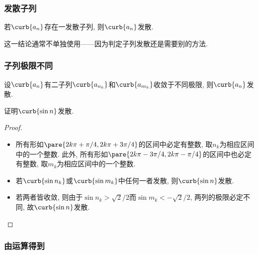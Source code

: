 \documentclass{ctexart}
\begin{document}

\subsubsection{发散子列} %
\label{ssub:发散子列}

\begin{theorem}[子列发散蕴含发散]
    \label{thm:子列发散蕴含发散}
    若$\curb{a_n}$存在一发散子列, 则$\curb{a_n}$发散.
\end{theorem}
这一结论通常不单独使用——因为判定子列发散还是需要别的方法.


\subsubsection{子列极限不同} %
\label{ssub:子列极限不同}

\begin{theorem}
    设$\curb{a_n}$有二子列$\curb{a_{n_k}}$和$\curb{a_{m_k}}$收敛于不同极限, 则$\curb{a_n}$发散.
\end{theorem}
\begin{sample}
    \begin{ex}
        证明$\curb{\sin n}$发散.
    \end{ex}
    \begin{proof}
        \begin{itemize}
            \item 所有形如$\pare{2k\pi + \pi/4, 2k\pi + 3\pi/4}$的区间中必定有整数, 取$n_k$为相应区间中的一个整数. 此外, 所有形如$\pare{2k\pi - 3\pi/4, 2k\pi - \pi/4}$的区间中也必定有整数, 取$m_k$为相应区间中的一个整数.
            \item 若$\curb{\sin n_k}$或$\curb{\sin m_k}$中任何一者发散, 则$\curb{\sin n}$发散.
            \item 若两者皆收敛, 则由于$\sin n_k > \sqrt{2}/2$而$\sin m_k < -\sqrt{2}/2$, 两列的极限必定不同, 故$\curb{\sin n}$发散.\qedhere
        \end{itemize}
    \end{proof}
\end{sample}


\subsubsection{由运算得到} %
\label{ssub:由运算得到}
\end{document}
